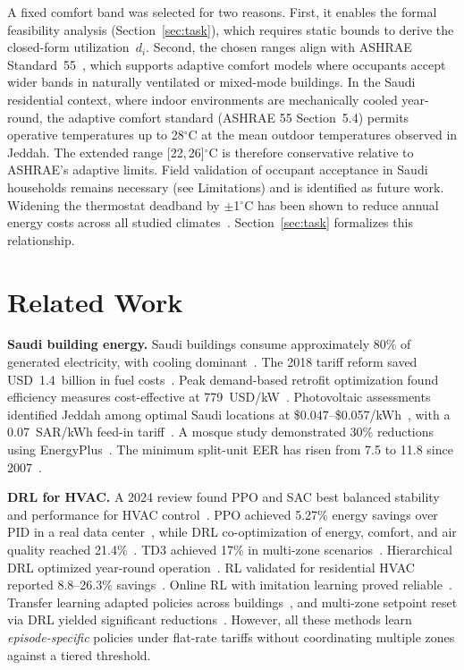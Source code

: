 \documentclass[12pt,a4paper]{article}
\begin{document}
A fixed comfort band was selected for two reasons. First, it enables the formal feasibility analysis (Section~\ref{sec:task}), which requires static bounds to derive the closed-form utilization~$d_i$. Second, the chosen ranges align with ASHRAE Standard~55~\cite{ref12}, which supports adaptive comfort models where occupants accept wider bands in naturally ventilated or mixed-mode buildings. In the Saudi residential context, where indoor environments are mechanically cooled year-round, the adaptive comfort standard (ASHRAE 55 Section~5.4) permits operative temperatures up to 28$^\circ$C at the mean outdoor temperatures observed in Jeddah. The extended range [22,\,26]$^\circ$C is therefore conservative relative to ASHRAE's adaptive limits. Field validation of occupant acceptance in Saudi households remains necessary (see Limitations) and is identified as future work. Widening the thermostat deadband by $\pm$1$^\circ$C has been shown to reduce annual energy costs across all studied climates~\cite{ref13}. Section~\ref{sec:task} formalizes this relationship.

\section{Related Work}
\label{sec:related}

\textbf{Saudi building energy.} Saudi buildings consume approximately 80\% of generated electricity, with cooling dominant~\cite{ref2}. The 2018 tariff reform saved USD~1.4~billion in fuel costs~\cite{ref14}. Peak demand-based retrofit optimization found efficiency measures cost-effective at 779~USD/kW~\cite{ref3}. Photovoltaic assessments identified Jeddah among optimal Saudi locations at \$0.047--\$0.057/kWh~\cite{ref15}, with a 0.07~SAR/kWh feed-in tariff~\cite{ref16}. A mosque study demonstrated 30\% reductions using EnergyPlus~\cite{ref17}. The minimum split-unit EER has risen from 7.5 to 11.8 since 2007~\cite{ref2}.

\textbf{DRL for HVAC.} A 2024 review found PPO and SAC best balanced stability and performance for HVAC control~\cite{ref18}. PPO achieved 5.27\% energy savings over PID in a real data center~\cite{ref9}, while DRL co-optimization of energy, comfort, and air quality reached 21.4\%~\cite{ref8}. TD3 achieved 17\% in multi-zone scenarios~\cite{ref7}. Hierarchical DRL optimized year-round operation~\cite{ref19}. RL validated for residential HVAC reported 8.8--26.3\% savings~\cite{ref20}. Online RL with imitation learning proved reliable~\cite{ref6}. Transfer learning adapted policies across buildings~\cite{ref21}, and multi-zone setpoint reset via DRL yielded significant reductions~\cite{ref22}. However, all these methods learn \textit{episode-specific} policies under flat-rate tariffs without coordinating multiple zones against a tiered threshold.
\end{document}
